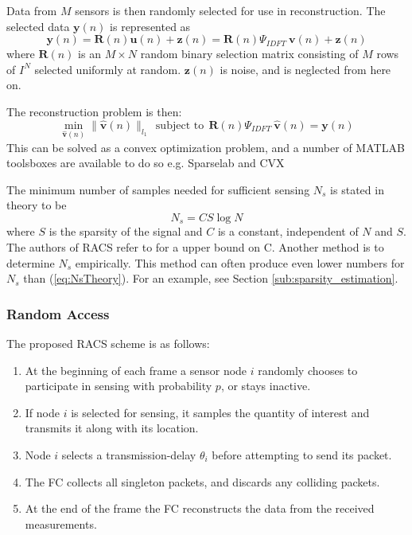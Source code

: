 \documentclass[Main]{subfiles}
\begin{document}
			\newpage
			Data from $M$ sensors is then randomly selected for use in reconstruction.
			The selected data $\mathbf{y}(n)$ is represented as
			\begin{equation}
				\mathbf{y}(n) = 
					\mathbf{R}(n) \mathbf{u}(n) + \mathbf{z}(n)
					= \mathbf{R}(n) \Psi_{IDFT}\ \mathbf{v}(n) + \mathbf{z}(n)
			\end{equation}
			where $\mathbf{R}(n)$ is an $M \times N$ random binary selection matrix consisting of $M$ rows of $I^N$ selected uniformly at random.
			$\mathbf{z}(n)$ is noise, and is neglected from here on.

			The reconstruction problem is then:
			\begin{equation}
				\min_{\mathbf{\hat{v}}(n)} 
					\|\mathbf{\hat{v}}(n)\|_{l_1} 
					\ \ \text{subject to} \ \ 
					\mathbf{R}(n) \Psi_{IDFT}\ \mathbf{\hat{v}}(n) = \mathbf{y}(n)
					\label{eq:minimizationProblem}
			\end{equation}
			This can be solved as a convex optimization problem, and a number of MATLAB toolsboxes are available to do so e.g. Sparselab \cite{SparseLab:Online} and CVX \cite{CVX:Online}

			The minimum number of samples needed for sufficient sensing $N_s$ is stated in theory to be
			\begin{equation}
				N_s = CS \log{N}
				\label{eq:NsTheory} 
			\end{equation}
			where $S$ is the sparsity of the signal and $C$ is a constant, independent of $N$ and $S$.
			The authors of RACS refer to \cite{Candes2006} for a upper bound on C.
			Another method is to determine $N_s$ empirically.
			This method can often produce even lower numbers for $N_s$ than (\ref{eq:NsTheory}).
			For an example, see Section \ref{sub:sparsity_estimation}.
		


		\subsubsection{Random Access} %
		\label{sub:random_access}

			The proposed RACS scheme is as follows:

			\begin{enumerate}[label=\bfseries \arabic*:]
				\item 
					At the beginning of each frame a sensor node $i$ randomly chooses to participate in sensing with probability $p$, or stays inactive.
				\item 
					If node $i$ is selected for sensing, it samples the quantity of interest and transmits it along with its location.
				\item
					Node $i$ selects a transmission-delay $\theta_{i}$ before attempting to send its packet.
				\item
					The FC collects all singleton packets, and discards any colliding packets.
				\item
					At the end of the frame the FC reconstructs  the data from the received measurements.

			\end{enumerate}
\end{document}
